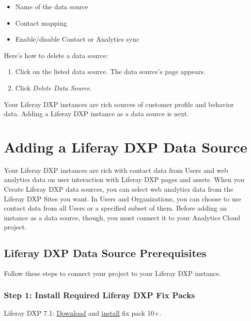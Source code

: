 \begin{itemize}
\tightlist
\item
  Name of the data source
\item
  Contact mapping
\item
  Enable/disable Contact or Analytics sync
\end{itemize}

Here's how to delete a data source:

\begin{enumerate}
\def\labelenumi{\arabic{enumi}.}
\item
  Click on the listed data source. The data source's page appears.
\item
  Click \emph{Delete Data Source}.
\end{enumerate}

Your Liferay DXP instances are rich sources of customer profile and
behavior data. Adding a Liferay DXP instance as a data source is next.

\section{Adding a Liferay DXP Data
Source}\label{adding-a-liferay-dxp-data-source}

Your Liferay DXP instances are rich with contact data from Users and web
analytics data on user interaction with Liferay DXP pages and assets.
When you Create Liferay DXP data sources, you can select web analytics
data from the Liferay DXP Sites you want. In Users and Organizations,
you can choose to use contact data from all Users or a specified subset
of them. Before adding an instance as a data source, though, you must
connect it to your Analytics Cloud project.

\subsection{Liferay DXP Data Source
Prerequisites}\label{liferay-dxp-data-source-prerequisites}

Follow these steps to connect your project to your Liferay DXP instance.

\subsubsection{Step 1: Install Required Liferay DXP Fix
Packs}\label{step-1-install-required-liferay-dxp-fix-packs}

Liferay DXP 7.1: \href{https://customer.liferay.com/downloads}{Download}
and
\href{/docs/7-1/deploy/-/knowledge_base/d/installing-patches}{install}
fix pack 10+.

